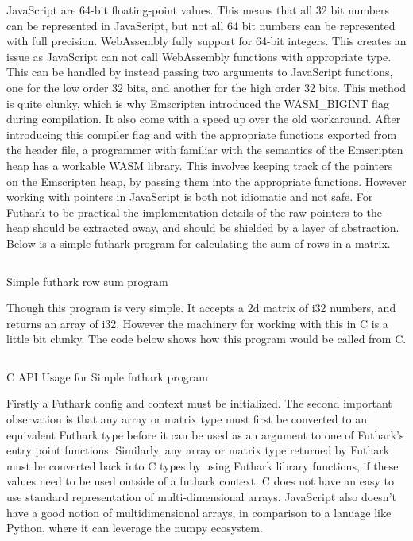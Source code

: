 \documentclass[11pt]{book}
\begin{document}
JavaScript are 64-bit floating-point values. This means that all 32 bit numbers can be represented in JavaScript, but not all 64 bit numbers can be represented with full precision. WebAssembly fully support for 64-bit integers. This creates an issue as JavaScript can not call WebAssembly functions with appropriate type. This can be handled by instead passing two arguments to JavaScript functions, one for the low order 32 bits, and another for the high order 32 bits. This method is quite clunky, which is why Emscripten introduced the WASM\_BIGINT flag during compilation. It also come with a speed up over the old workaround. 
After introducing this compiler flag and with the appropriate functions exported from the header file,  %
a programmer with familiar with the semantics of the Emscripten heap has a workable WASM library. This involves keeping track of the pointers on the Emscripten heap, by passing them into the appropriate functions. However working with pointers in JavaScript is both not idiomatic and not safe. For Futhark to be practical the implementation details of the raw pointers to the heap should be extracted away, and should be shielded by a layer of abstraction.
Below is a simple futhark program for calculating the sum of rows in a matrix. 

\begin{listing}[H] 
        \inputminted[fontsize=\small,baselinestretch=0.5,linenos]{haskell}{code/compiler/c-backend/main.fut}
        \caption{Simple futhark row sum program}
        \label{lst:futhark-capi}   

\end{listing} 

Though this program is very simple. It accepts a 2d matrix of i32 numbers, and returns an array of i32. However the machinery for working with this in C is a little bit clunky. The code below shows how this program would be called from C.

\begin{listing}[H] 
        \inputminted[fontsize=\small,baselinestretch=0.5,linenos]{C}{code/compiler/c-backend/example.c}
        \caption{C API Usage for Simple futhark program}

        \label{lst:capi}    
\end{listing} 

Firstly a Futhark config and context must be initialized. The second important observation is that any array or matrix type must first be converted to an equivalent Futhark type before it can be used as an argument to one of Futhark's entry point functions. Similarly, any array or matrix type returned by Futhark must be converted back into C types by using Futhark library functions, if these values need to be used outside of a futhark context. C does not have an easy to use standard representation of multi-dimensional arrays. JavaScript also doesn't have a good notion of multidimensional arrays, in comparison to a lanuage like Python, where it can leverage the numpy ecosystem. 
\end{document}
